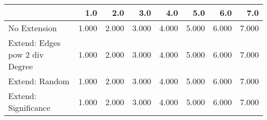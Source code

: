 \begin{tabular}{lrrrrrrr}
\toprule
{} &   1.0 &   2.0 &   3.0 &   4.0 &   5.0 &   6.0 &   7.0 \\
\midrule
No Extension                   & 1.000 & 2.000 & 3.000 & 4.000 & 5.000 & 6.000 & 7.000 \\
Extend: Edges pow 2 div Degree & 1.000 & 2.000 & 3.000 & 4.000 & 5.000 & 6.000 & 7.000 \\
Extend: Random                 & 1.000 & 2.000 & 3.000 & 4.000 & 5.000 & 6.000 & 7.000 \\
Extend: Significance           & 1.000 & 2.000 & 3.000 & 4.000 & 5.000 & 6.000 & 7.000 \\
\bottomrule
\end{tabular}
